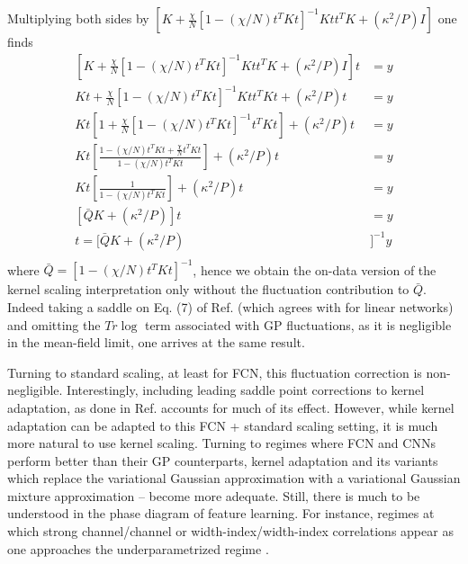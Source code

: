 Multiplying both sides by $\left[K+\frac{\chi}{N}[1-(\chi/N)t^T K t]^{-1} Ktt^TK +(\kappa^2/P) I\right]$ one finds 
\begin{align}
\left[K+\frac{\chi}{N}[1-(\chi/N)t^T K t]^{-1} Ktt^TK +(\kappa^2/P) I\right] t &= y \\ \nonumber 
K t +\frac{\chi}{N}[1-(\chi/N)t^T K t]^{-1} Ktt^TK t +(\kappa^2/P) t &= y \\ \nonumber 
K t\left[1 +\frac{\chi}{N}[1-(\chi/N)t^T K t]^{-1} t^TK t\right] + (\kappa^2/P) t &= y \\ \nonumber 
K t\left[\frac{1-(\chi/N)t^T K t+\frac{\chi}{N}t^TK t}{1-(\chi/N)t^T Kt}\right] + (\kappa^2/P) t &= y \\ \nonumber
K t\left[\frac{1}{1-(\chi/N)t^T Kt}\right] + (\kappa^2/P) t &= y \\ \nonumber
[\bar{Q} K+(\kappa^2/P)]t &= y \\ \nonumber
t = [\bar{Q} K+(\kappa^2/P)&]^{-1}y \\ \nonumber
\end{align}
where $\bar{Q}=[1-(\chi/N)t^T K t]^{-1}$, hence we obtain the on-data version of the kernel scaling interpretation only without the fluctuation contribution to $\bar{Q}$. Indeed taking a saddle on Eq. (7) of Ref. \citep{ariosto2022statistical} (which agrees with \citep{LiSompolinsky2021} for linear networks) and omitting the $Tr\log$ term associated with GP fluctuations, as it is negligible in the mean-field limit, one arrives at the same result. 

Turning to standard scaling, at least for FCN, this fluctuation correction is non-negligible. Interestingly, including leading saddle point corrections to kernel adaptation, as done in Ref. \cite{rubin2025kernels} accounts for much of its effect. However, while kernel adaptation can be adapted to this FCN + standard scaling setting, it is much more natural to use kernel scaling. Turning to regimes where FCN and CNNs perform better than their GP counterparts, kernel adaptation and its variants which replace the variational Gaussian approximation with a variational Gaussian mixture approximation \citep{rubin2024grokking}-- become more adequate. Still, there is much to be understood in the phase diagram of feature learning. For instance, regimes at which strong channel/channel or width-index/width-index correlations appear as one approaches the underparametrized regime \citep{bricken2023monosemanticity}.    


